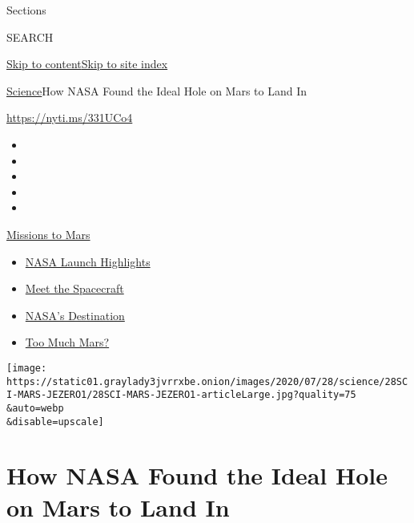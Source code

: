 Sections

SEARCH

\protect\hyperlink{site-content}{Skip to
content}\protect\hyperlink{site-index}{Skip to site index}

\href{/section/science}{Science}\textbar{}How NASA Found the Ideal Hole
on Mars to Land In

\url{https://nyti.ms/331UCo4}

\begin{itemize}
\item
\item
\item
\item
\item
\end{itemize}

\href{https://www.nytimes3xbfgragh.onion/news-event/summer-of-mars?action=click\&pgtype=Article\&state=default\&region=TOP_BANNER\&context=storylines_menu}{Missions
to Mars}

\begin{itemize}
\tightlist
\item
  \href{https://www.nytimes3xbfgragh.onion/2020/07/30/science/nasa-mars-launch.html?action=click\&pgtype=Article\&state=default\&region=TOP_BANNER\&context=storylines_menu}{NASA
  Launch Highlights}
\item
  \href{https://www.nytimes3xbfgragh.onion/interactive/2020/science/mars-perseverance-tianwen-hope.html?action=click\&pgtype=Article\&state=default\&region=TOP_BANNER\&context=storylines_menu}{Meet
  the Spacecraft}
\item
  \href{https://www.nytimes3xbfgragh.onion/2020/07/28/science/nasa-jezero-perseverance.html?action=click\&pgtype=Article\&state=default\&region=TOP_BANNER\&context=storylines_menu}{NASA's
  Destination}
\item
  \href{https://www.nytimes3xbfgragh.onion/2020/07/28/science/mars-nasa-science.html?action=click\&pgtype=Article\&state=default\&region=TOP_BANNER\&context=storylines_menu}{Too
  Much Mars?}
\end{itemize}

\texttt{[image: https://static01.graylady3jvrrxbe.onion/images/2020/07/28/science/28SCI-MARS-JEZERO1/28SCI-MARS-JEZERO1-articleLarge.jpg?quality=75\\\&auto=webp\\\&disable=upscale]}

\hypertarget{how-nasa-found-the-ideal-hole-on-mars-to-land-in}{%
\section{How NASA Found the Ideal Hole on Mars to Land
In}\label{how-nasa-found-the-ideal-hole-on-mars-to-land-in}}


